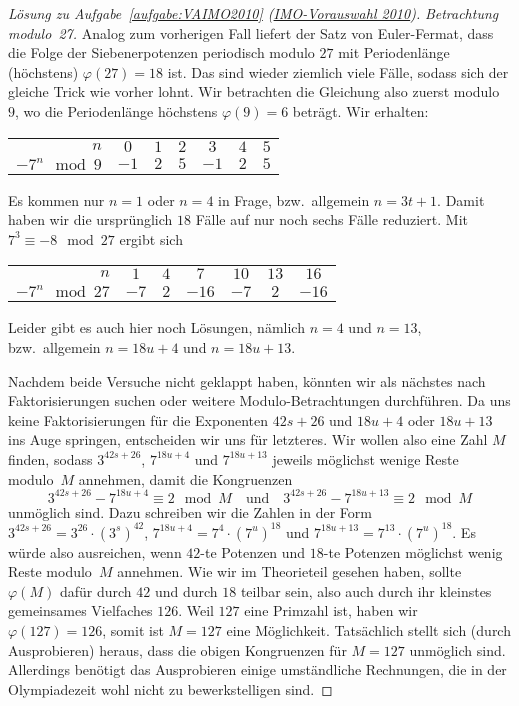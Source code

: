 \begin{proof}[Lösung zu Aufgabe~\ref{aufgabe:VAIMO2010} \textmd{(\href{https://www.mathe-wettbewerbe.de/fileadmin/Mathe-Wettbewerbe/AIMO/Aufgaben_und_Loesungen_AIMO/aufgaben_awb_10.pdf}{IMO-Vorauswahl 2010})}]
	
	\emph{Betrachtung modulo~27.} Analog zum vorherigen Fall liefert der Satz von Euler-Fermat, dass die Folge der Siebenerpotenzen periodisch modulo $27$ mit Periodenlänge (höchstens) $\varphi(27)=18$ ist. Das sind wieder ziemlich viele Fälle, sodass sich der gleiche Trick wie vorher lohnt. Wir betrachten die Gleichung also zuerst modulo~$9$, wo die Periodenlänge höchstens $\varphi(9)=6$ beträgt. Wir erhalten:
	\begin{center}
		\begin{tabular}{r | c c c c c c}\toprule
			$n$ & $0$ & $1$ & $2$ & $3$ & $4$ & $5$ \\%
			$-7^n\mod 9$ & $-1$ & $2$ & $5$ & $-1$ & $2$ & $5$\\\bottomrule
		\end{tabular}
	\end{center}
	Es kommen nur $n=1$ oder $n=4$ in Frage, bzw.\ allgemein $n=3t+1$. Damit haben wir die ursprünglich $18$ Fälle auf nur noch sechs Fälle reduziert. Mit $7^3\equiv -8\mod 27$ ergibt sich
	\begin{center}
		\begin{tabular}{r | c c c c c c}\toprule
			$n$ & $1$ & $4$ & $7$ & $10$ & $13$ & $16$ \\%
			$-7^n\mod 27$ & $-7$ & $2$ & $-16$ & $-7$ & $2$ & $-16$\\\bottomrule
		\end{tabular}
	\end{center}
	Leider gibt es auch hier noch Lösungen, nämlich $n=4$ und $n=13$, bzw.\ allgemein $n=18u+4$ und $n=18u+13$.
	
	Nachdem beide Versuche nicht geklappt haben, könnten wir als nächstes nach Faktorisierungen suchen oder weitere Modulo-Betrachtungen durchführen. Da uns keine Faktorisierungen für die Exponenten $42s+26$ und $18u+4$ oder $18u+13$ ins Auge springen, entscheiden wir uns für letzteres. Wir wollen also eine Zahl $M$ finden, sodass $3^{42s+26}$, $7^{18u+4}$ und $7^{18u+13}$ jeweils möglichst wenige Reste modulo~$M$ annehmen, damit die Kongruenzen
	\begin{equation*}
		3^{42s+26}-7^{18u+4}\equiv 2\mod M\quad\text{und}\quad 3^{42s+26}-7^{18u+13}\equiv 2\mod M
	\end{equation*}
	unmöglich sind. Dazu schreiben wir die Zahlen in der Form $3^{42s+26}=3^{26}\cdot (3^s)^{42}$, $7^{18u+4}=7^4\cdot (7^u)^{18}$ und $7^{18u+13}=7^{13}\cdot (7^u)^{18}$. Es würde also ausreichen, wenn $42$-te Potenzen und $18$-te Potenzen möglichst wenig Reste modulo~$M$ annehmen. Wie wir im Theorieteil gesehen haben, sollte $\varphi(M)$ dafür durch $42$ und durch $18$ teilbar sein, also auch durch ihr kleinstes gemeinsames Vielfaches $126$. Weil $127$ eine Primzahl ist, haben wir $\varphi(127)=126$, somit ist $M=127$ eine Möglichkeit. Tatsächlich stellt sich (durch Ausprobieren) heraus, dass die obigen Kongruenzen für $M=127$ unmöglich sind. Allerdings benötigt das Ausprobieren einige umständliche Rechnungen, die in der Olympiadezeit wohl nicht zu bewerkstelligen sind.
	

\end{proof}
